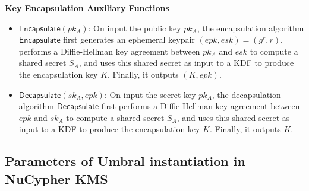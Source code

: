 \documentclass[12pt]{article}
\begin{document}
\textbf{Key Encapsulation Auxiliary Functions}
\begin{itemize}
	\item $\mathsf{Encapsulate}(pk_A)$: On input the public key $pk_A$, %
	the encapsulation algorithm $\mathsf{Encapsulate}$ first generates an ephemeral keypair $(epk, esk) = (g^r, r)$, performs a Diffie-Hellman key agreement between $pk_A$ and $esk$ to compute a shared secret $S_A$, and uses this shared secret as input to a KDF to produce the encapsulation key $K$. Finally, it outputs $(K, epk)$.
	\item $\mathsf{Decapsulate}(sk_A, epk)$: On input the secret key $pk_A$, %
	the decapsulation algorithm $\mathsf{Decapsulate}$ first performs a Diffie-Hellman key agreement between $epk$ and $sk_A$ to compute a shared secret $S_A$, and uses this shared secret as input to a KDF to produce the encapsulation key $K$. Finally, it outputs $K$.
\end{itemize}

\subsection{Parameters of Umbral instantiation in NuCypher KMS}

\end{document}
